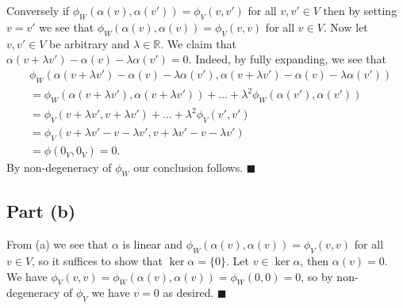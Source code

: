 \documentclass[12pt]{article}
\begin{document}
Conversely if $\phi_W(\alpha(v), \alpha(v'))=\phi_V(v, v')$ for all $v,v'\in V$
then by setting $v=v'$ we see that
$\phi_W(\alpha(v),\alpha(v))=\phi_V(v,v)$ for all $v\in V$.
Now let $v,v'\in V$ be arbitrary and $\lambda\in\mathbb{R}$. We claim that
$\alpha(v+\lambda v')-\alpha(v)-\lambda\alpha(v')=0$. Indeed, by fully expanding,
we see that
\begin{align*}
    &\phi_W(
        \alpha(v+\lambda v')-\alpha(v)-\lambda\alpha(v'),
        \alpha(v+\lambda v')-\alpha(v)-\lambda\alpha(v')
    )
    \\&= \phi_W(\alpha(v+\lambda v'), \alpha(v+\lambda v'))+\ldots
    + \lambda^2\phi_W(\alpha(v'), \alpha(v'))
    \\&= \phi_V(v+\lambda v', v+\lambda v')+\ldots
    + \lambda^2\phi_V(v', v')
    \\&= \phi_V(v+\lambda v'-v-\lambda v',v+\lambda v'-v-\lambda v')
    \\&=\phi(0_V, 0_V)=0.
\end{align*}
By non-degeneracy of $\phi_W$ our conclusion follows.
\hfill$\blacksquare$

\subsection*{Part (b)}
From (a) we see that $\alpha$ is linear and
$\phi_W(\alpha(v),\alpha(v))=\phi_V(v,v)$ for all $v\in V$, so it suffices
to show that $\ker\alpha=\{0\}$. Let $v\in\ker\alpha$, then $\alpha(v)=0$.
We have $\phi_V(v, v) = \phi_W(\alpha(v), \alpha(v))=\phi_W(0,0)=0$,
so by non-degeneracy of $\phi_V$ we have $v=0$ as desired.
\hfill$\blacksquare$
\end{document}
